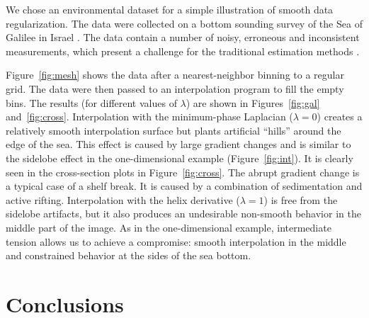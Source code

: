 We chose an environmental dataset \cite{iee} for a simple illustration
of smooth data regularization. The data were collected on a bottom
sounding survey of the Sea of Galilee in Israel \cite{zvi}.  The data
contain a number of noisy, erroneous and inconsistent measurements,
which present a challenge for the traditional estimation methods
\cite{galilee}.
\par
Figure~\ref{fig:mesh} shows the data after a nearest-neighbor binning
to a regular grid. The data were then passed to an interpolation
program to fill the empty bins. The results (for different values of
$\lambda$) are shown in Figures~\ref{fig:gal} and~\ref{fig:cross}.
Interpolation with the minimum-phase Laplacian ($\lambda=0$) creates a
relatively smooth interpolation surface but plants artificial
``hills'' around the edge of the sea. This effect is caused by large
gradient changes and is similar to the sidelobe effect in the
one-dimensional example (Figure~\ref{fig:int}).  It is clearly seen in
the cross-section plots in Figure~\ref{fig:cross}.  The abrupt
gradient change is a typical case of a shelf break. It is caused by a
combination of sedimentation and active rifting. Interpolation with
the helix derivative ($\lambda=1$) is free from the sidelobe
artifacts, but it also produces an undesirable non-smooth behavior in
the middle part of the image. As in the one-dimensional example,
intermediate tension allows us to achieve a compromise: smooth
interpolation in the middle and constrained behavior at the sides of
the sea bottom.





\section{Conclusions}

